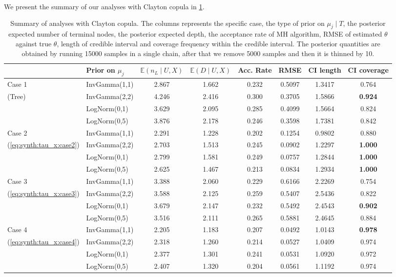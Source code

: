 \documentclass{amsart}
\begin{document}
We present the summary of our analyses with Clayton copula in \cref{tab:clayton:summary}. 


\begin{table}[ht]
	\centering
	\caption{Summary of analyses with Clayton copula. The columns represents the specific case, the type of prior on $\mu_j\mid T$, the posterior expected number of terminal nodes, the posterior expected depth, the acceptance rate of MH algorithm, RMSE of estimated $\theta$ against true $\theta$, length of credible interval and coverage frequency within the credible interval. The posterior quantities are obtained by running 15000 samples in a single chain, after that we remove 5000 samples and then it is thinned by 10.}
	\label{tab:clayton:summary}
	\scriptsize{
		\begin{tabular}{ll|cccccc}
			\toprule
			& Prior on $\mu_j$ & $\mathbb{E}(n_L\mid U,X)$ & $\mathbb{E}(D\mid U,X)$ & Acc. Rate & RMSE & CI length & CI coverage \\ 
			\midrule
			Case 1 & InvGamma(1,1) & 2.867 & 1.662 & 0.232 & 0.5097 & 1.3417 & 0.764 \\ 
			(Tree) & InvGamma(2,2) & 4.246 & 2.416 & 0.300 & 0.3705 & 1.5866 & \textbf{0.924} \\ 
			& LogNorm(0,1) & 3.629 & 2.095 & 0.285 & 0.4099 & 1.5664 & 0.824 \\ 
			& LogNorm(0,5) & 3.876 & 2.178 & 0.246 & 0.3598 & 1.7381 & 0.842 \\ 
			\midrule
			Case 2 & InvGamma(1,1) & 2.291 & 1.228 & 0.202 & 0.1254 & 0.9802 & 0.880 \\ 
			(\cref{eq:synth:tau_x:case2}) & InvGamma(2,2) & 2.703 & 1.513 & 0.245 & 0.0902 & 1.2297 & \textbf{1.000} \\ 
			& LogNorm(0,1) & 2.799 & 1.581 & 0.249 & 0.0757 & 1.2844 & \textbf{1.000} \\ 
			& LogNorm(0,5) & 2.625 & 1.467 & 0.213 & 0.0834 & 1.2934 & \textbf{1.000} \\ 
			\midrule
			Case 3 & InvGamma(1,1) & 3.388 & 2.060 & 0.229 & 0.6166 & 2.2269 & 0.754 \\ 
			(\cref{eq:synth:tau_x:case3}) & InvGamma(2,2) & 3.588 & 2.125 & 0.259 & 0.5407 & 2.5436 & 0.822 \\ 
			& LogNorm(0,1) & 3.679 & 2.147 & 0.232 & 0.5492 & 2.4543 & \textbf{0.902} \\ 
			& LogNorm(0,5) & 3.516 & 2.111 & 0.265 & 0.5881 & 2.4645 & 0.884 \\ 
			\midrule
			Case 4 & InvGamma(1,1) & 2.205 & 1.183 & 0.207 & 0.0492 & 1.0143 & \textbf{0.978} \\ 
			(\cref{eq:synth:tau_x:case4}) & InvGamma(2,2) & 2.318 & 1.260 & 0.214 & 0.0527 & 1.0409 & 0.974 \\ 
			& LogNorm(0,1) & 2.377 & 1.301 & 0.241 & 0.0531 & 1.0920 & 0.972 \\ 
			& LogNorm(0,5) & 2.407 & 1.320 & 0.204 & 0.0561 & 1.1192 & 0.974 \\ 
	\end{tabular}}
\end{table}
\end{document}
